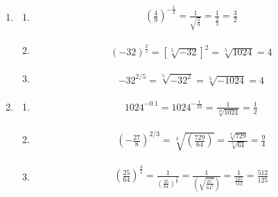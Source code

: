 \documentclass{article}
\begin{document}
\begin{enumerate}
\begin{enumerate}
\begin{align*}
			             = 14 
		            \end{align*}
		      \item
		            \begin{align*}
			            \frac{\sqrt{48}}{\sqrt{3}}
			             = \frac{4\sqrt{3}}{\sqrt{3}}
			             = 4 
		            \end{align*}
		      \item
		            \begin{align*}
			            \sqrt[4]{24}*\sqrt[4]{54}
			             = \sqrt[4]{1296}
			             = 6
		            \end{align*}
	      \end{enumerate}
	\item
	      \begin{enumerate}
		      \item
		            \begin{align*}
			            \left(\frac{4}{9}\right)^{-\frac{1}{2}}
			             = \frac{1}{\sqrt{\frac{4}{9}}}
			             = \frac{1}{\frac{2}{3}}
			             = \frac{3}{2}
		            \end{align*}
		      \item
		            \begin{align*}
			            (-32)^{\frac{2}{5}}
			             = \left[\sqrt[5]{-32}\right]^2
			             = \sqrt[5]{1024}
			             = 4
		            \end{align*}
		      \item
		            \begin{align*}
			            -32^{2/5}
			             = \sqrt[5]{-32^2}
			             = \sqrt[5]{-1024}
			             = 4
		            \end{align*}
	      \end{enumerate}
	\item
	      \begin{enumerate}
		      \item
		            \begin{align*}
			            1024^{-0.1}  = 1024^{-\frac{1}{10}}
			             = \frac{1}{\sqrt[10]{1024}}
			             = \frac{1}{2}
		            \end{align*}
		      \item
		            \begin{align*}
			            \left(-\frac{27}{8}\right)^{2/3}
			             = \sqrt[3]{\left(\frac{729}{64}\right)}
			             = \frac{\sqrt[3]{729}}{\sqrt[3]{64}}
			             = \frac{9}{4}
		            \end{align*}
		      \item
		            \begin{align*}
			            \left(\frac{25}{64}\right)^{\frac{3}{2}}
			             = \frac{1}{\left(\frac{25}{64}\right)^{\frac{3}{2}}}
			             = \frac{1}{\left(\sqrt{\frac{{25^3}}{64^3}}\right)}
			             = \frac{1}{\frac{125}{512}}
			             = \frac{512}{125}
		            \end{align*}
	      \end{enumerate}
\end{enumerate}
\end{document}
